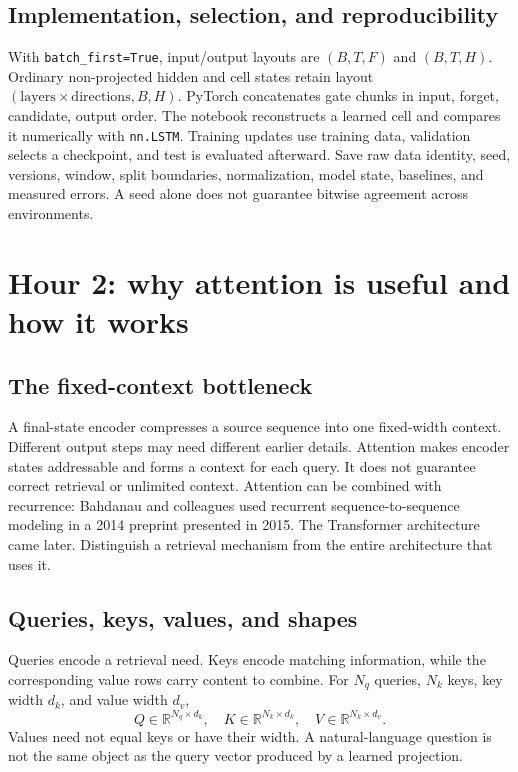 \documentclass[11pt,oneside]{book}
\begin{document}
\subsection{Implementation, selection, and reproducibility}
With \texttt{batch\_first=True}, input/output layouts are $(B,T,F)$ and
$(B,T,H)$. Ordinary non-projected hidden and cell states retain layout
$(\mathrm{layers}\times\mathrm{directions},B,H)$. PyTorch concatenates
gate chunks in input, forget, candidate, output order. The notebook
reconstructs a learned cell and compares it numerically with \texttt{nn.LSTM}.
Training updates use training data, validation selects a checkpoint, and
test is evaluated afterward. Save raw data identity, seed, versions, window,
split boundaries, normalization, model state, baselines, and measured errors.
A seed alone does not guarantee bitwise agreement across environments.

\section{Hour 2: why attention is useful and how it works}
\subsection{The fixed-context bottleneck}
A final-state encoder compresses a source sequence into one fixed-width
context. Different output steps may need different earlier details.
Attention makes encoder states addressable and forms a context for each
query. It does not guarantee correct retrieval or unlimited context.
Attention can be combined with recurrence: Bahdanau and colleagues used
recurrent sequence-to-sequence modeling in a 2014 preprint presented in
2015. The Transformer architecture came later. Distinguish a retrieval
mechanism from the entire architecture that uses it.

\subsection{Queries, keys, values, and shapes}
Queries encode a retrieval need. Keys encode matching information, while
the corresponding value rows carry content to combine. For $N_q$ queries,
$N_k$ keys, key width $d_k$, and value width $d_v$,
\[Q\in\mathbb R^{N_q\times d_k},\quad
K\in\mathbb R^{N_k\times d_k},\quad V\in\mathbb R^{N_k\times d_v}.\]
Values need not equal keys or have their width. A natural-language question
is not the same object as the query vector produced by a learned projection.
\end{document}

